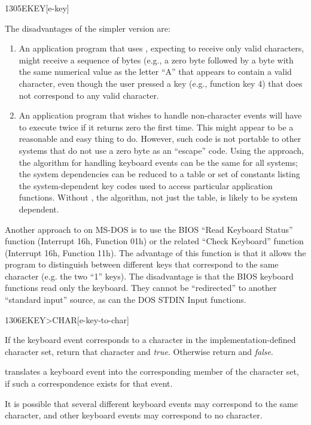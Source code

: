 \begin{worddef}{1305}{EKEY}[e-key]
\begin{defer}
		The disadvantages of the simpler version are:

		\begin{enumerate}
		\item An application program that uses ,
			expecting to receive only valid characters, might receive a
			sequence of bytes (e.g., a zero byte followed by a byte with
			the same numerical value as the letter ``A'' that appears to
			contain a valid character, even though the user pressed a key
			(e.g., function key 4) that does not correspond to any valid
			character.

		\item An application program that wishes to handle non-character
			events will have to execute  twice if it
			returns zero the first time. This might appear to be a
			reasonable and easy thing to do. However, such code is not
			portable to other systems that do not use a zero byte as an
			``escape'' code. Using the  approach, the
			algorithm for handling keyboard events can be the same for
			all systems; the system dependencies can be reduced to a
			table or set of constants listing the system-dependent key
			codes used to access particular application functions.
			Without , the algorithm, not just the table, is
			likely to be system dependent.
		\end{enumerate}

		Another approach to  on MS-DOS is to use the BIOS
		``Read Keyboard Status'' function (Interrupt 16h, Function 01h)
		or the related ``Check Keyboard'' function (Interrupt 16h,
		Function 11h). The advantage of this function is that it allows
		the program to distinguish between different keys that correspond
		to the same character (e.g. the two ``1'' keys). The disadvantage
		is that the BIOS keyboard functions read only the keyboard. They
		cannot be ``redirected'' to another ``standard input'' source,
		as can the DOS STDIN Input functions.
	\end{defer}
\end{worddef}


\begin{worddef}[EKEYtoCHAR]{1306}{EKEY>CHAR}[e-key-to-char]
\item {}

	If the keyboard event  corresponds to a character in the
	implementation-defined character set, return that character and
	\emph{true}. Otherwise return  and \emph{false}.

	\begin{defer}
	\rationale %
		 translates a keyboard event into the
		corresponding member of the character set, if such a
		correspondence exists for that event.

		It is possible that several different keyboard events may
		correspond to the same character, and other keyboard events
		may correspond to no character.
	\end{defer}
\end{worddef}


